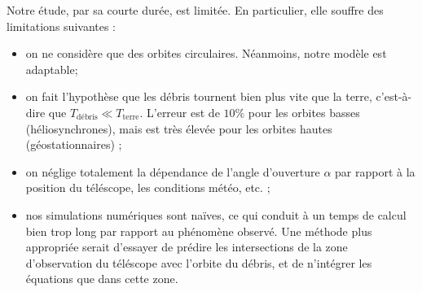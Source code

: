 \documentclass[a4paper,11pt]{article}
\numberwithin{section}{part}
\begin{document}
Notre étude, par sa courte durée, est limitée. En particulier, elle
souffre des limitations suivantes :
\begin{itemize}
\item on ne considère que des orbites circulaires. Néanmoins, notre
  modèle est adaptable;
\item on fait l'hypothèse que les débris tournent bien plus vite que
  la terre, c'est-à-dire que $T_{\text{débris}} \ll
  T_{\text{terre}}$. L'erreur est de $10\%$ pour les orbites basses
  (héliosynchrones), mais est très élevée pour les orbites hautes
  (géostationnaires) ;
\item on néglige totalement la dépendance de l'angle d'ouverture
  $\alpha$ par rapport à la position du téléscope, les conditions
  météo, etc. ;
\item nos simulations numériques sont naïves, ce qui conduit à un
  temps de calcul bien trop long par rapport au phénomène observé. Une
  méthode plus appropriée serait d'essayer de prédire les
  intersections de la zone d'observation du téléscope avec l'orbite du
  débris, et de n'intégrer les équations que dans cette zone.
\end{itemize}



\appendix


% 


\begin{thebibliography}{99}
\end{thebibliography}
\end{document}
